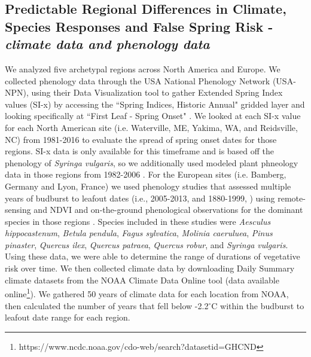 \documentclass{article}\usepackage[]{graphicx}\usepackage[]{color}
\begin{document}
\subsection*{Predictable Regional Differences in Climate, Species Responses and False Spring Risk - \textit{climate data and phenology data}}
We analyzed five archetypal regions across North America and Europe. We collected phenology data through the USA National Phenology Network (USA-NPN), using their Data Visualization tool to gather Extended Spring Index values (SI-x) by accessing the ``Spring Indices, Historic Annual" gridded layer and looking specifically at ``First Leaf - Spring Onset" \citep{SI-x2016}. We looked at each SI-x value for each North American site (i.e. Waterville, ME, Yakima, WA, and Reidsville, NC) from 1981-2016 to evaluate the spread of spring onset dates for those regions. SI-x data is only available for this timeframe and is based off the phenology of \textit{Syringa vulgaris}, so we additionally used modeled plant phneology data in those regions from 1982-2006 \citep{White2009}. For the European sites (i.e. Bamberg, Germany and Lyon, France) we used phenology studies that assessed multiple years of budburst to leafout dates (i.e., 2005-2013, \cite{Soudani2012} and 1880-1999, \cite{Schaber2005}) using remote-sensing and NDVI \citep{Soudani2012} and on-the-ground phenological observations for the dominant species in those regions \citep{Schaber2005}. Species included in these studies were \textit{Aesculus hippocastenum}, \textit{Betula pendula}, \textit{Fagus sylvatica}, \textit{Molinia caeruluea}, \textit{Pinus pinaster}, \textit{Quercus ilex}, \textit{Quercus patraea}, \textit{Quercus robur}, and \textit{Syringa vulgaris}. Using these data, we were able to determine the range of durations of vegetative risk over time. We then collected climate data by downloading Daily Summary climate datasets from the NOAA Climate Data Online tool (data available online\footnote{https://www.ncdc.noaa.gov/cdo-web/search?datasetid=GHCND}). We gathered 50 years of climate data for each location from NOAA, then calculated the number of years that fell below -2.2$^{\circ}$C within the budburst to leafout date range for each region.  

\newpage
\nocite{Flynn}

\end{document}
